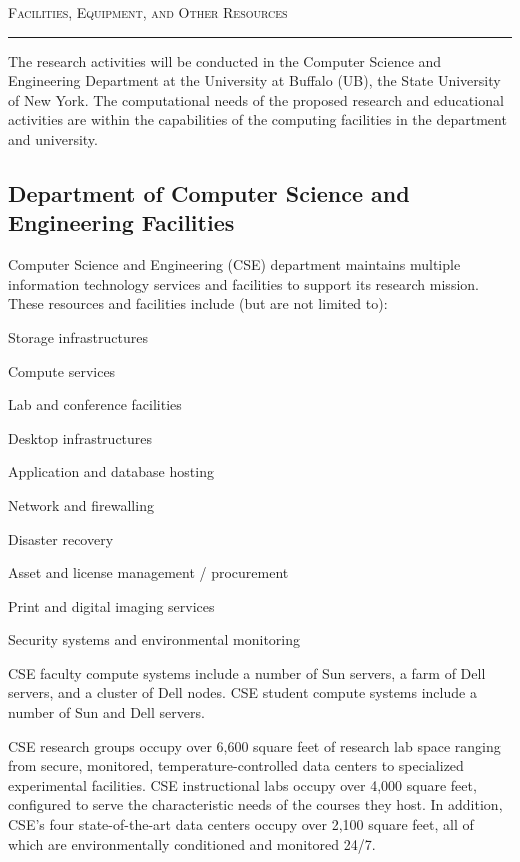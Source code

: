

\usepackage{paralist}



\begin{center}
{\LARGE
\textsc{Facilities, Equipment, and Other Resources}
}
\end{center}
\hrule

\vspace{3mm}

The research activities will be conducted in the Computer Science and
Engineering Department at the University at Buffalo (UB), the State
University of New York. The computational needs of the proposed
research and educational activities are within the capabilities of the
computing facilities in the department and university.

\subsection*{Department of Computer Science and Engineering Facilities}

Computer Science and Engineering (CSE) department maintains multiple
information technology services and facilities to support its research
mission. These resources and facilities include (but are not limited to): 

\medskip 
\begin{compactitem}
  \item Storage infrastructures
  \item Compute services
  \item Lab and conference facilities
  \item Desktop infrastructures
  \item Application and database hosting
  \item Network and firewalling
  \item Disaster recovery
  \item Asset and license management / procurement
  \item Print and digital imaging services
  \item Security systems and environmental monitoring 
\end{compactitem}

\medskip \noindent
CSE faculty compute systems include a number of Sun servers, a farm of Dell
servers, and a cluster of Dell nodes. CSE student compute systems include a
number of Sun and Dell servers.
 
CSE research groups occupy over 6,600 square feet of research lab space
ranging from secure, monitored, temperature-controlled data centers to
specialized experimental facilities. CSE instructional labs occupy over
4,000 square feet, configured to serve the characteristic needs of the
courses they host. In addition, CSE's four state-of-the-art data centers
occupy over 2,100 square feet, all of which are environmentally conditioned
and monitored 24/7. 


